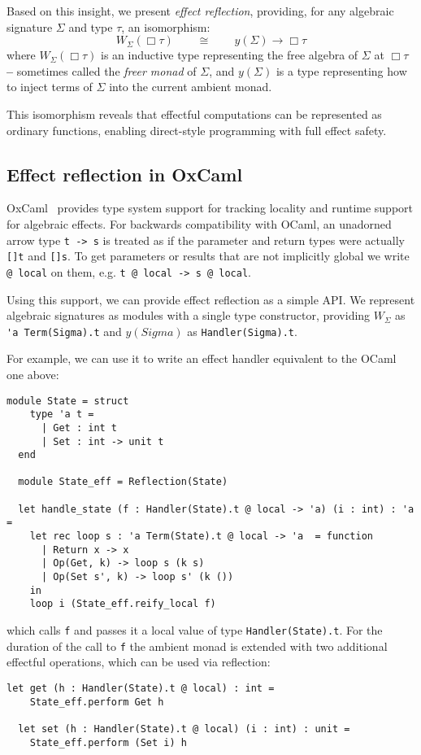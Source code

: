 \documentclass[acmsmall, screen, review, anonymous]{acmart}
\theoremstyle{definition}
\newcommand{\glob}{\mathop{\Box}}
\newcommand{\yoneda}[1]{y(#1)}
\newcommand{\ind}[1]{W_{#1}}
\begin{document}
Based on this insight, we present \emph{effect reflection}, providing,
for any algebraic signature $\Sigma$ and type $\tau$, an isomorphism:
\begin{equation*}
  \ind{\Sigma}(\glob \tau)
  \qquad \cong \qquad
  \yoneda{\Sigma} \rightarrow \glob \tau
\end{equation*}
where $\ind{\Sigma}(\glob \tau)$ is an inductive type representing the
free algebra of $\Sigma$ at $\glob \tau$ \textbf{--} sometimes called
the \emph{freer monad} of $\Sigma$, and $\yoneda{\Sigma}$ is a type
representing how to inject terms of $\Sigma$ into the current ambient
monad.

This isomorphism reveals that effectful computations can be represented
as ordinary functions, enabling direct-style programming with full
effect safety.

\subsection{Effect reflection in OxCaml}
OxCaml~\cite{lorenzen2024oxidizing} provides type system support for
tracking locality and runtime support for algebraic effects. For
backwards compatibility with OCaml, an unadorned arrow type
\lstinline[style=oxcaml]{t -> s} is treated as if the parameter and
return types were actually \lstinline[style=oxcaml]{[]t} and
\lstinline[style=oxcaml]{[]s}. To get parameters or results that are not
implicitly global we write \lstinline[style=oxcaml]{@ local} on them,
e.g. \lstinline[style=oxcaml]{t @ local -> s @ local}.

Using this support, we can provide effect reflection as a simple API.
We represent algebraic signatures as modules with a single type
constructor, providing $\ind{\Sigma}$ as
\lstinline[style=oxcaml]{'a Term(Sigma).t} and $\yoneda{Sigma}$ as
\lstinline[style=oxcaml]{Handler(Sigma).t}.

For example, we can use it to write an effect handler equivalent to the
OCaml one above:
\begin{lstlisting}[style=oxcaml]
  module State = struct
    type 'a t =
      | Get : int t
      | Set : int -> unit t
  end

  module State_eff = Reflection(State)

  let handle_state (f : Handler(State).t @ local -> 'a) (i : int) : 'a =
    let rec loop s : 'a Term(State).t @ local -> 'a  = function
      | Return x -> x
      | Op(Get, k) -> loop s (k s)
      | Op(Set s', k) -> loop s' (k ())
    in
    loop i (State_eff.reify_local f)
\end{lstlisting}
which calls \lstinline[style=oxcaml]{f} and passes it a local value of
type \lstinline[style=oxcaml]{Handler(State).t}. For the duration of the
call to \lstinline[style=oxcaml]{f} the ambient monad is extended with
two additional effectful operations, which can be used via reflection:
\begin{lstlisting}[style=oxcaml]
  let get (h : Handler(State).t @ local) : int =
    State_eff.perform Get h

  let set (h : Handler(State).t @ local) (i : int) : unit =
    State_eff.perform (Set i) h
\end{lstlisting}
\end{document}
